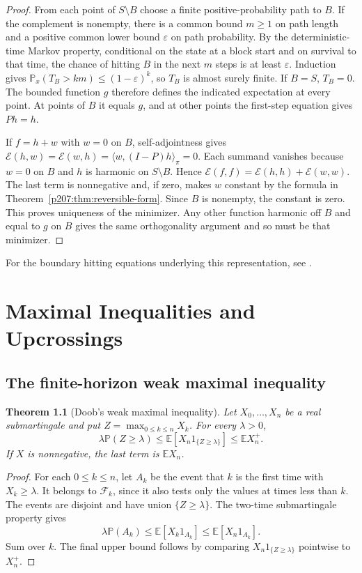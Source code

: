 \documentclass[11pt,oneside,openany]{book}
\theoremstyle{plain}
\newtheorem{theorem}{Theorem}[chapter]
\theoremstyle{definition}
\theoremstyle{remark}
\begin{document}
\begin{proof}
From each point of \(S\setminus B\) choose a finite positive-probability
path to \(B\). If the complement is nonempty, there is a common bound
\(m\geq1\) on path length and a positive common lower bound
\(\varepsilon\) on path probability. By the deterministic-time
Markov property, conditional on the state at a block start and on
survival to that time, the chance of hitting \(B\) in the next
\(m\) steps is at least \(\varepsilon\). Induction gives
\(\mathbb P_x(T_B>km)\leq(1-\varepsilon)^k\), so \(T_B\) is
almost surely finite. If \(B=S\), \(T_B=0\). The bounded function
\(g\) therefore defines the indicated expectation at every point.
At points of \(B\) it equals \(g\), and at other points the first-step
equation gives \(Ph=h\).

If \(f=h+w\) with \(w=0\) on \(B\), self-adjointness gives
\(\mathcal E(h,w)=\mathcal E(w,h)=\langle w,(I-P)h\rangle_\pi=0\).
Each summand vanishes because \(w=0\) on \(B\) and \(h\) is harmonic
on \(S\setminus B\). Hence
\(\mathcal E(f,f)=\mathcal E(h,h)+\mathcal E(w,w)\).
The last term is nonnegative and, if zero, makes \(w\) constant by
the formula in Theorem~\ref{p207:thm:reversible-form}. Since \(B\)
is nonempty, the constant is zero. This proves uniqueness of the
minimizer. Any other function harmonic off \(B\) and equal to \(g\)
on \(B\) gives the same orthogonality argument and so must be that
minimizer.
\end{proof}

For the boundary hitting equations underlying this representation,
see \cite[\S1.3]{Norris}.
\chapter{Maximal Inequalities and Upcrossings}

\section{The finite-horizon weak maximal inequality}\label{p207:W26}

\begin{theorem}[Doob's weak maximal inequality]
Let \(X_0,\ldots,X_n\) be a real submartingale and put
\(Z=\max_{0\le k\le n}X_k\). For every \(\lambda>0\),
\[
 \lambda\mathbb P(Z\ge\lambda)
 \le \mathbb E[X_n1_{\{Z\ge\lambda\}}]
 \le \mathbb E X_n^+.
\]
If \(X\) is nonnegative, the last term is \(\mathbb E X_n\).
\end{theorem}
\begin{proof}
For each \(0\le k\le n\), let \(A_k\) be the event that \(k\)
is the first time with \(X_k\ge\lambda\). It belongs to
\(\mathcal F_k\), since it also tests only the values at times
less than \(k\). The events are disjoint and have union
\(\{Z\ge\lambda\}\). The two-time submartingale property gives
\[
 \lambda\mathbb P(A_k)
 \le \mathbb E[X_k1_{A_k}]
 \le \mathbb E[X_n1_{A_k}].
\]
Sum over \(k\). The final upper bound follows by comparing
\(X_n1_{\{Z\ge\lambda\}}\) pointwise to \(X_n^+\).
\end{proof}
\end{document}
